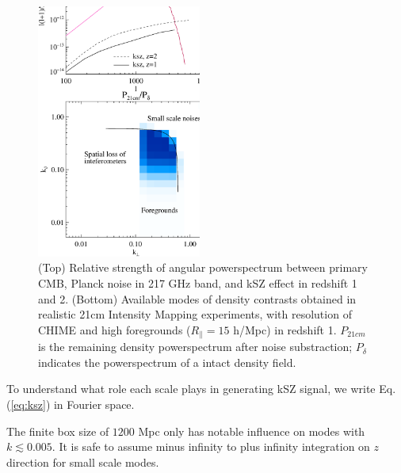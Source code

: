 \begin{figure}[tbp]
\begin{center}
\includegraphics[width=0.48\textwidth]{figure/cmb_21cm.eps}
\end{center}
\vspace{-0.7cm}
\caption{
    (Top) Relative strength of angular powerspectrum between primary CMB, Planck noise in 217 GHz band, and kSZ effect in redshift 1 and 2.
    (Bottom) Available modes of density contrasts obtained 
    in realistic 21cm Intensity Mapping experiments, 
    with resolution of CHIME and high foregrounds ($R_\parallel=15$ h/Mpc) 
    in redshift 1. 
    $P_{21cm}$ is the remaining density powerspectrum after noise substraction; 
    $P_\delta$ indicates the powerspectrum of a intact density field.
}
\label{fig:cmb_21cm}
\end{figure}

To understand what role each scale plays in generating kSZ signal, we write Eq.(\ref{eq:ksz}) in Fourier space. 

The finite box size of $1200$ Mpc only has notable influence on modes with $k\lesssim0.005$. 
It is safe to assume 
minus infinity to plus infinity 
integration on $z$ direction for small scale modes. 

